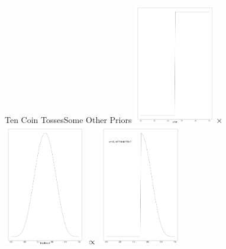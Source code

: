 \documentclass[dvipsnames,mathserif, handout]{beamer}
\begin{document}
{\begin{frame}{Ten Coin Tosses}{Some Other Priors}
		\includegraphics[valign=m, width=100pt]{cointosses/step_prior.pdf} $\times$
	    	\includegraphics[valign=m, width=100pt]{cointosses/Ten_pre.pdf} $\propto$
	    	\includegraphics[valign=m, width=100pt]{cointosses/step_Ten.pdf}
\end{frame}

}
\end{document}
